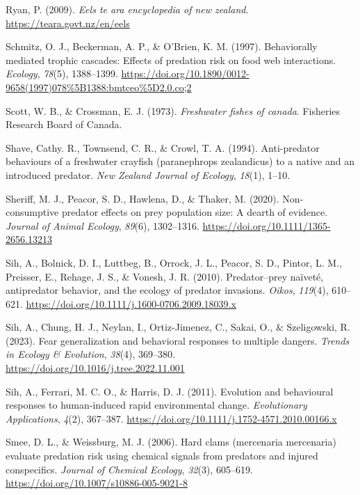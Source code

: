 \documentclass[
  letterpaper,
  DIV=11,
  numbers=noendperiod]{scrartcl}
\newlength{\cslhangindent}
\newenvironment{CSLReferences}[2] %
 {\begin{list}{}{%
  \setlength{\itemindent}{0pt}
  \setlength{\leftmargin}{0pt}
  \setlength{\parsep}{0pt}
  \ifodd #1
   \setlength{\leftmargin}{\cslhangindent}
   \setlength{\itemindent}{-1\cslhangindent}
  \fi
  \setlength{\itemsep}{#2\baselineskip}}}
 {\end{list}}
\begin{document}
\begin{CSLReferences}{1}{0}
Ryan, P. (2009). \emph{Eels \textbar{} te ara encyclopedia of new
zealand}. \url{https://teara.govt.nz/en/eels}

Schmitz, O. J., Beckerman, A. P., \& O'Brien, K. M. (1997). Behaviorally
mediated trophic cascades: Effects of predation risk on food web
interactions. \emph{Ecology}, \emph{78}(5), 1388--1399.
\url{https://doi.org/10.1890/0012-9658(1997)078\%5B1388:bmtceo\%5D2.0.co;2}

Scott, W. B., \& Crossman, E. J. (1973). \emph{Freshwater fishes of
canada}. Fisheries Research Board of Canada.

Shave, Cathy. R., Townsend, C. R., \& Crowl, T. A. (1994). Anti-predator
behaviours of a freshwater crayfish (paranephrops zealandicus) to a
native and an introduced predator. \emph{New Zealand Journal of
Ecology}, \emph{18}(1), 1--10.

Sheriff, M. J., Peacor, S. D., Hawlena, D., \& Thaker, M. (2020).
Non-consumptive predator effects on prey population size: A dearth of
evidence. \emph{Journal of Animal Ecology}, \emph{89}(6), 1302--1316.
\url{https://doi.org/10.1111/1365-2656.13213}

Sih, A., Bolnick, D. I., Luttbeg, B., Orrock, J. L., Peacor, S. D.,
Pintor, L. M., Preisser, E., Rehage, J. S., \& Vonesh, J. R. (2010).
Predator--prey naïveté, antipredator behavior, and the ecology of
predator invasions. \emph{Oikos}, \emph{119}(4), 610--621.
\url{https://doi.org/10.1111/j.1600-0706.2009.18039.x}

Sih, A., Chung, H. J., Neylan, I., Ortiz-Jimenez, C., Sakai, O., \&
Szeligowski, R. (2023). Fear generalization and behavioral responses to
multiple dangers. \emph{Trends in Ecology \& Evolution}, \emph{38}(4),
369--380. \url{https://doi.org/10.1016/j.tree.2022.11.001}

Sih, A., Ferrari, M. C. O., \& Harris, D. J. (2011). Evolution and
behavioural responses to human‐induced rapid environmental change.
\emph{Evolutionary Applications}, \emph{4}(2), 367--387.
\url{https://doi.org/10.1111/j.1752-4571.2010.00166.x}

Smee, D. L., \& Weissburg, M. J. (2006). Hard clams (mercenaria
mercenaria) evaluate predation risk using chemical signals from
predators and injured conspecifics. \emph{Journal of Chemical Ecology},
\emph{32}(3), 605--619. \url{https://doi.org/10.1007/s10886-005-9021-8}


\end{CSLReferences}
\end{document}
